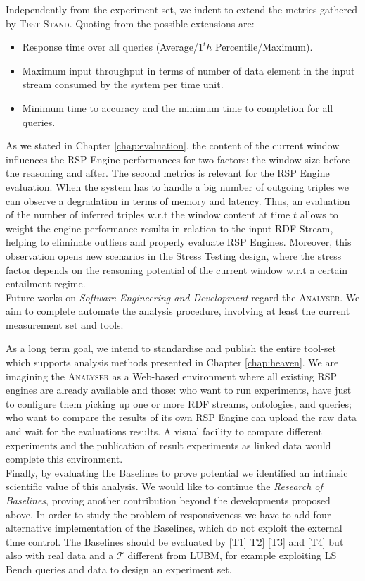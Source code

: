 Independently from the experiment set, we indent to extend the metrics gathered by \name \textsc{Test Stand}. Quoting from \cite{DBLP:conf/esws/ScharrenbachUMVB13} the possible extensions are:
\begin{itemize}
\item Response time over all queries (Average/$1^th$ Percentile/Maximum).
\item Maximum input throughput in terms of number of data element in the input stream consumed by the system per time unit.
\item Minimum time to accuracy and the minimum time to completion for all queries.
\end{itemize}

As we stated in Chapter \ref{chap:evaluation}, the content of the current window influences the RSP Engine performances for two factors: the window size before the reasoning and after. The second metrics is relevant for the RSP Engine evaluation. When the system has to handle a big number of outgoing triples we can observe a degradation in terms of memory and latency. Thus, an evaluation of the number of inferred triples w.r.t the window content at time $t$ allows to weight the engine performance results in relation to the input RDF Stream, helping to eliminate outliers and properly evaluate RSP Engines. Moreover, this observation opens new scenarios in the Stress Testing design, where the stress factor depends on the reasoning potential of the current window w.r.t a certain entailment regime.\\

\noindent Future works on \textit{Software Engineering and Development} regard the \textsc{Analyser}.  We aim to complete automate the analysis procedure, involving at least the current measurement set and tools. 

As a long term goal, we intend to standardise and publish the entire tool-set which supports analysis methods presented in Chapter \ref{chap:heaven}. We are imagining the \name \textsc{Analyser} as a Web-based environment where all existing RSP engines are already available and those: who want to run experiments, have just to configure them picking up one or more RDF streams, ontologies, and queries; who want to compare the results of its own RSP Engine can upload the raw data and wait for the evaluations results. A visual facility to compare different experiments and the publication of result experiments as linked data would complete this environment. \\


\noindent Finally, by evaluating the Baselines to prove \name potential we identified an intrinsic scientific value of this analysis. We would like to continue the \textit{Research of Baselines}, proving another contribution beyond the developments proposed above. In order to study the problem of responsiveness we have to add four alternative implementation of the Baselines, which do not exploit the external time control. The Baselines should be evaluated by [T1] T2] [T3] and [T4] but also with real data and a $\mathcal{T}$ different from LUBM, for example exploiting LS Bench queries and data to design an experiment set. 
